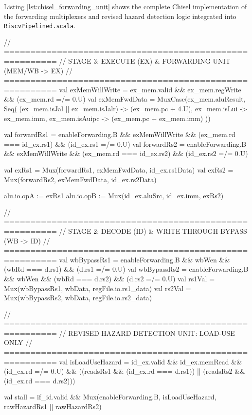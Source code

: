 Listing \ref{lst:chisel_forwarding_unit} shows the complete Chisel implementation of the forwarding multiplexers and revised hazard detection logic integrated into \texttt{RiscvPipelined.scala}.

\begin{chiselcode}[caption={Chisel implementation of distance-1 forwarding, distance-2 write-through bypass, and load-use hazard detection in \texttt{RiscvPipelined.scala}.},label={lst:chisel_forwarding_unit}]
// ========================================================
// STAGE 3: EXECUTE (EX) & FORWARDING UNIT (MEM/WB -> EX)
// ========================================================
val exMemWillWrite = ex_mem.valid && ex_mem.regWrite && (ex_mem.rd =/= 0.U)
val exMemFwdData = MuxCase(ex_mem.aluResult, Seq(
  (ex_mem.isJal || ex_mem.isJalr) -> (ex_mem.pc + 4.U),
  ex_mem.isLui                    -> ex_mem.imm,
  ex_mem.isAuipc                  -> (ex_mem.pc + ex_mem.imm)
))

val forwardRs1 = enableForwarding.B && exMemWillWrite && (ex_mem.rd === id_ex.rs1) && (id_ex.rs1 =/= 0.U)
val forwardRs2 = enableForwarding.B && exMemWillWrite && (ex_mem.rd === id_ex.rs2) && (id_ex.rs2 =/= 0.U)

val exRs1 = Mux(forwardRs1, exMemFwdData, id_ex.rs1Data)
val exRs2 = Mux(forwardRs2, exMemFwdData, id_ex.rs2Data)

alu.io.opA := exRs1
alu.io.opB := Mux(id_ex.aluSrc, id_ex.imm, exRs2)

// ========================================================
// STAGE 2: DECODE (ID) & WRITE-THROUGH BYPASS (WB -> ID)
// ========================================================
val wbBypassRs1 = enableForwarding.B && wbWen && (wbRd === d.rs1) && (d.rs1 =/= 0.U)
val wbBypassRs2 = enableForwarding.B && wbWen && (wbRd === d.rs2) && (d.rs2 =/= 0.U)
val rs1Val = Mux(wbBypassRs1, wbData, regFile.io.rs1_data)
val rs2Val = Mux(wbBypassRs2, wbData, regFile.io.rs2_data)

// ========================================================
// REVISED HAZARD DETECTION UNIT: LOAD-USE ONLY
// ========================================================
val isLoadUseHazard = id_ex.valid && id_ex.memRead && (id_ex.rd =/= 0.U) &&
                      ((readsRs1 && (id_ex.rd === d.rs1)) || (readsRs2 && (id_ex.rd === d.rs2)))

val stall = if_id.valid && Mux(enableForwarding.B, isLoadUseHazard, rawHazardRs1 || rawHazardRs2)
\end{chiselcode}


